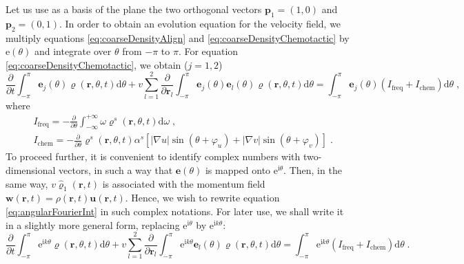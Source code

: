 \documentclass{article}
\begin{document}
Let us use as a basis of the plane the two orthogonal vectors $\mathbf{p}_1=(1,0)$ and $\mathbf{p}_2=(0,1)$. In order to obtain an evolution equation for the velocity field, we multiply equations \eqref{eq:coarseDensityAlign} and \eqref{eq:coarseDensityChemotactic} by $\mathrm{e}\left(\theta\right)$ and integrate over $\theta$ from $-\pi$ to $\pi$. For equation \eqref{eq:coarseDensityChemotactic}, we obtain ($j=1,2$)
\begin{equation}
    \label{eq:angularFourierInt}
    \frac{\partial}{\partial t}\int_{-\pi}^{\pi}{\mathbf{e}_j\left( \theta \right) \varrho \left( \mathbf{r},\theta ,t \right) \mathrm{d}\theta}+v\sum_{l=1}^2{\frac{\partial}{\partial \mathbf{r}_l}\int_{-\pi}^{\pi}{\mathbf{e}_j\left( \theta \right) \mathbf{e}_l\left( \theta \right) \varrho \left( \mathbf{r},\theta ,t \right) \mathrm{d}\theta}}=\int_{-\pi}^{\pi}{\mathbf{e}_j\left( \theta \right) \left( I_{\mathrm{freq}}+I_{\mathrm{chem}} \right) \mathrm{d}\theta}\;,
\end{equation}
where 
\begin{subequations}
    \label{eq:angularFourierIntSub}
    \begin{align}
        &I_{\mathrm{freq}}=-\frac{\partial}{\partial \theta}\int_{-\infty}^{+\infty}{\omega \varrho ^s\left( \mathbf{r},\theta ,t \right) \mathrm{d}\omega}\;,\\
        &I_{\mathrm{chem}}=-\frac{\partial}{\partial \theta}\varrho ^s\left( \mathbf{r},\theta ,t \right) \alpha ^s\left[ \left| \nabla u \right|\sin \left( \theta +\varphi _u \right) +\left| \nabla v \right|\sin \left( \theta +\varphi _v \right) \right]\;.
    \end{align}
\end{subequations}
To proceed further, it is convenient to identify complex numbers with two-dimensional vectors, in such a way that $\mathbf{e}(\theta)$ is mapped onto $\mathrm{e}^{\mathrm{i}\theta}$. Then, in the same way, $v\hat{\varrho}_1\left( \mathbf{r},t \right) $ is associated with the momentum field $\mathbf{w}\left( \mathbf{r},t \right) =\rho \left( \mathbf{r},t \right) \mathbf{u}\left( \mathbf{r},t \right) $. Hence, we wish to rewrite equation \eqref{eq:angularFourierInt} in such complex notations. For later use, we shall write it in a slightly more general form, replacing $\mathrm{e}^{\mathrm{i}\theta}$ by $\mathrm{e}^{\mathrm{i}k \theta}$:
\begin{equation}
    \label{eq:angularFourierIntComplex}
    \frac{\partial}{\partial t}\int_{-\pi}^{\pi}{\mathrm{e}^{\mathrm{i}k\theta}\varrho \left( \mathbf{r},\theta ,t \right) \mathrm{d}\theta}+v\sum_{l=1}^2{\frac{\partial}{\partial \mathbf{r}_l}\int_{-\pi}^{\pi}{\mathrm{e}^{\mathrm{i}k\theta}\mathbf{e}_l\left( \theta \right) \varrho \left( \mathbf{r},\theta ,t \right) \mathrm{d}\theta}}=\int_{-\pi}^{\pi}{\mathrm{e}^{\mathrm{i}k\theta}\left( I_{\mathrm{freq}}+I_{\mathrm{chem}} \right) \mathrm{d}\theta}\;.
\end{equation}
\end{document}
